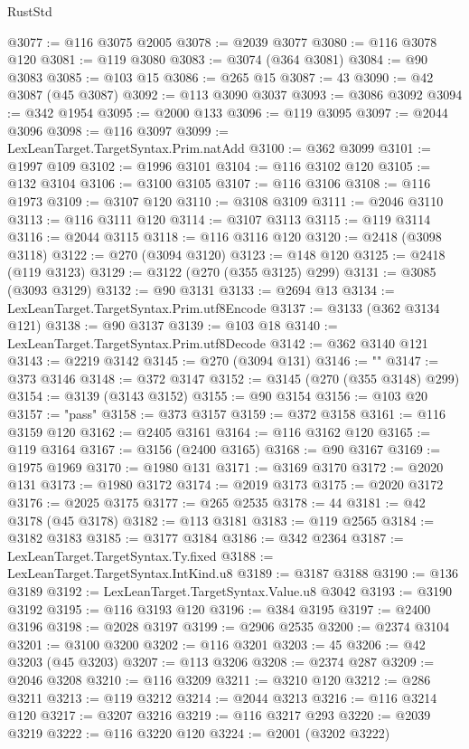 \begin{lexlean}{RustStd}
\begin{coremodule}
@3077 := @116 @3075 @2005
@3078 := @2039 @3077
@3080 := @116 @3078 @120
@3081 := @119 @3080
@3083 := @3074 (@364 @3081)
@3084 := @90 @3083
@3085 := @103 @15
@3086 := @265 @15
@3087 := 43
@3090 := @42 @3087 (@45 @3087)
@3092 := @113 @3090 @3037
@3093 := @3086 @3092
@3094 := @342 @1954
@3095 := @2000 @133
@3096 := @119 @3095
@3097 := @2044 @3096
@3098 := @116 @3097
@3099 := LexLeanTarget.TargetSyntax.Prim.natAdd
@3100 := @362 @3099
@3101 := @1997 @109
@3102 := @1996 @3101
@3104 := @116 @3102 @120
@3105 := @132 @3104
@3106 := @3100 @3105
@3107 := @116 @3106
@3108 := @116 @1973
@3109 := @3107 @120
@3110 := @3108 @3109
@3111 := @2046 @3110
@3113 := @116 @3111 @120
@3114 := @3107 @3113
@3115 := @119 @3114
@3116 := @2044 @3115
@3118 := @116 @3116 @120
@3120 := @2418 (@3098 @3118)
@3122 := @270 (@3094 @3120)
@3123 := @148 @120
@3125 := @2418 (@119 @3123)
@3129 := @3122 (@270 (@355 @3125) @299)
@3131 := @3085 (@3093 @3129)
@3132 := @90 @3131
@3133 := @2694 @13
@3134 := LexLeanTarget.TargetSyntax.Prim.utf8Encode
@3137 := @3133 (@362 @3134 @121)
@3138 := @90 @3137
@3139 := @103 @18
@3140 := LexLeanTarget.TargetSyntax.Prim.utf8Decode
@3142 := @362 @3140 @121
@3143 := @2219 @3142
@3145 := @270 (@3094 @131)
@3146 := ""
@3147 := @373 @3146
@3148 := @372 @3147
@3152 := @3145 (@270 (@355 @3148) @299)
@3154 := @3139 (@3143 @3152)
@3155 := @90 @3154
@3156 := @103 @20
@3157 := "pass"
@3158 := @373 @3157
@3159 := @372 @3158
@3161 := @116 @3159 @120
@3162 := @2405 @3161
@3164 := @116 @3162 @120
@3165 := @119 @3164
@3167 := @3156 (@2400 @3165)
@3168 := @90 @3167
@3169 := @1975 @1969
@3170 := @1980 @131
@3171 := @3169 @3170
@3172 := @2020 @131
@3173 := @1980 @3172
@3174 := @2019 @3173
@3175 := @2020 @3172
@3176 := @2025 @3175
@3177 := @265 @2535
@3178 := 44
@3181 := @42 @3178 (@45 @3178)
@3182 := @113 @3181
@3183 := @119 @2565
@3184 := @3182 @3183
@3185 := @3177 @3184
@3186 := @342 @2364
@3187 := LexLeanTarget.TargetSyntax.Ty.fixed
@3188 := LexLeanTarget.TargetSyntax.IntKind.u8
@3189 := @3187 @3188
@3190 := @136 @3189
@3192 := LexLeanTarget.TargetSyntax.Value.u8 @3042
@3193 := @3190 @3192
@3195 := @116 @3193 @120
@3196 := @384 @3195
@3197 := @2400 @3196
@3198 := @2028 @3197
@3199 := @2906 @2535
@3200 := @2374 @3104
@3201 := @3100 @3200
@3202 := @116 @3201
@3203 := 45
@3206 := @42 @3203 (@45 @3203)
@3207 := @113 @3206
@3208 := @2374 @287
@3209 := @2046 @3208
@3210 := @116 @3209
@3211 := @3210 @120
@3212 := @286 @3211
@3213 := @119 @3212
@3214 := @2044 @3213
@3216 := @116 @3214 @120
@3217 := @3207 @3216
@3219 := @116 @3217 @293
@3220 := @2039 @3219
@3222 := @116 @3220 @120
@3224 := @2001 (@3202 @3222)

\end{coremodule}
\end{lexlean}
